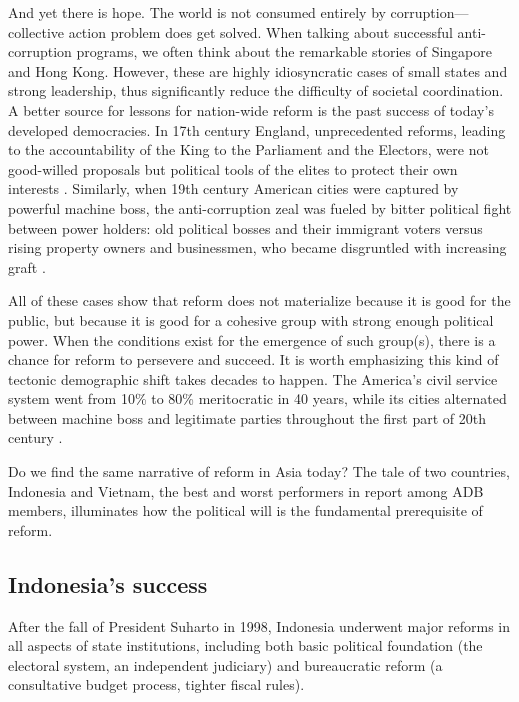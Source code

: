 \documentclass[12pt]{article}
\begin{document}
And yet there is hope. The world is not consumed entirely by corruption---collective action problem does get solved. When talking about successful anti-corruption programs, we often think about the remarkable stories of Singapore and Hong Kong. However, these are highly idiosyncratic cases of small states and strong leadership, thus significantly reduce the difficulty of societal coordination. A better source for lessons for nation-wide reform is the past success of today's developed democracies. In 17th century England, unprecedented reforms, leading to the accountability of the King to the Parliament and the Electors, were not good-willed proposals but political tools of the elites to protect their own interests \citep[5]{Johnston2010a}. Similarly, when 19th century American cities were captured by powerful machine boss, the anti-corruption zeal was fueled by bitter political fight between power holders: old political bosses and their immigrant voters versus rising property owners and businessmen, who became disgruntled with increasing graft \citep[204]{Rose-Ackerman1999}.

All of these cases show that reform does not materialize because it is good for the public, but because it is good for a cohesive group with strong enough political power. When the conditions exist for the emergence of such group(s), there is a chance for reform to persevere and succeed. It is worth emphasizing this kind of tectonic demographic shift takes decades to happen. The America's civil service system went from 10\% to 80\% meritocratic in 40 years, while its cities alternated between machine boss and legitimate parties throughout the first part of 20th century \citep{Rose-Ackerman1999}.

Do we find the same narrative of reform in Asia today? The tale of two countries, Indonesia and Vietnam, the best and worst performers in \citet{Integrity2012a} report among ADB members, illuminates how the political will is the fundamental prerequisite of reform.

\subsection{Indonesia's success} \label{sec:Indonesia}

After the fall of President Suharto in 1998, Indonesia underwent major reforms in all aspects of state institutions, including both basic political foundation (the electoral system, an independent judiciary) and bureaucratic reform (a consultative budget process, tighter fiscal rules).
\end{document}
